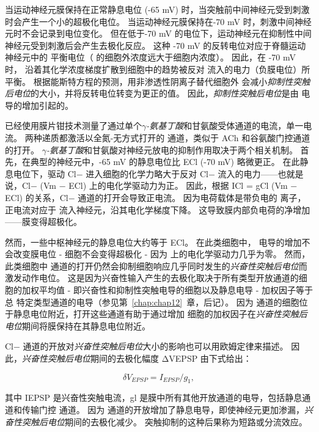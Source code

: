 当运动神经元膜保持在正常静息电位 (-65 mV) 时，当突触前中间神经元受到刺激时会产生一个小的超极化电位。
当运动神经元膜保持在-70 mV 时，刺激中间神经元时不会记录到电位变化。
但在低于-70 mV 的电位下，运动神经元在抑制性中间神经元受到刺激后会产生去极化反应。
这种 -70 mV 的反转电位对应于脊髓运动神经元中的  平衡电位（ 的细胞外浓度远大于细胞内浓度）。
因此，在 -70 mV 时， 沿着其化学浓度梯度扩散到细胞中的趋势被反对  流入的电力（负膜电位）所平衡。
根据能斯特方程的预测，用非渗透性阴离子替代细胞外  会减小\textit{抑制性突触后电位}的大小，并将反转电位转变为更正的值。
因此，\textit{抑制性突触后电位}是由  电导的增加引起的。


已经使用膜片钳技术测量了通过单个\textit{$\gamma$-氨基丁酸}和甘氨酸受体通道的电流，单一电流。
两种递质都激活以全氮-无方式打开的  通道，类似于 ACh 和谷氨酸门控通道的打开。
\textit{$\gamma$-氨基丁酸}和甘氨酸对神经元放电的抑制作用取决于两个相关机制。
首先，在典型的神经元中，-65 mV 的静息电位比 ECl (-70 mV) 略微更正。
在此静息电位下，驱动 Cl− 进入细胞的化学力略大于反对 Cl− 流入的电力——也就是说，Cl− (Vm − ECl) 上的电化学驱动力为正。
因此，根据 ICl = gCl (Vm − ECl) 的关系，Cl− 通道的打开会导致正电流。 因为电荷载体是带负电的  离子，正电流对应于  流入神经元，沿其电化学梯度下降。
这导致膜内部负电荷的净增加——膜变得超极化。


然而，一些中枢神经元的静息电位大约等于 ECl。 在此类细胞中， 电导的增加不会改变膜电位 - 细胞不会变得超极化 - 因为  上的电化学驱动力几乎为零。
然而，此类细胞中  通道的打开仍然会抑制细胞响应几乎同时发生的\textit{兴奋性突触后电位}而激发动作电位。
这是因为兴奋性输入产生的去极化取决于所有类型开放通道的细胞的加权平均值 - 即兴奋性和抑制性突触电导的细胞以及静息电导 - 加权因子等于总 特定类型通道的电导（参见第~\ref{chap:chap12}~章，后记）。
因为  通道的细胞位于静息电位附近，打开这些通道有助于通过增加  细胞的加权因子在\textit{兴奋性突触后电位}期间将膜保持在其静息电位附近。


Cl− 通道的开放对\textit{兴奋性突触后电位}大小的影响也可以用欧姆定律来描述。
因此，\textit{兴奋性突触后电位}期间的去极化幅度 ΔVEPSP 由下式给出：


\begin{equation}\label{depolarization_amplitude}
	\delta V_{EPSP} = I_{EPSP} / g_1,
\end{equation}


其中 IEPSP 是兴奋性突触电流，gl 是膜中所有其他开放通道的电导，包括静息通道和传输门控  通道。 因为  通道的开放增加了静息电导，即使神经元更加渗漏，\textit{兴奋性突触后电位}期间的去极化减少。
突触抑制的这种后果称为短路或分流效应。


